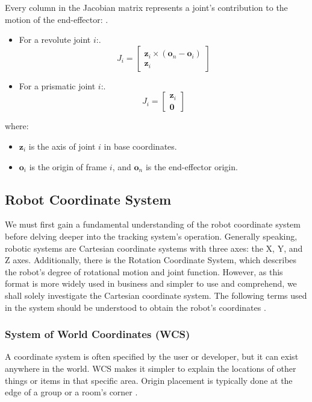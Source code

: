 \documentclass[12pt]{article}
\begin{document}
Every column in the Jacobian matrix represents a joint's contribution to the motion of the end-effector: \cite{ref19}.
\begin{itemize}
    \item For a revolute joint $i$:\cite{ref19}.
    \[
        J_i = \begin{bmatrix}
            \mathbf{z}_i \times (\mathbf{o}_n - \mathbf{o}_i)\\
            \mathbf{z}_i 
        \end{bmatrix}
    \]
    \item For a prismatic joint $i$:\cite{ref19}.
    \[
        J_i = \begin{bmatrix} 
            \mathbf{z}_i \\
            \mathbf{0}
        \end{bmatrix}
    \]
\end{itemize}
where:
\begin{itemize}
    \item $\mathbf{z}_i$ is the axis of joint $i$ in base coordinates.
    \item $\mathbf{o}_i$ is the origin of frame $i$, and $\mathbf{o}_n$ is the end-effector origin.
\end{itemize}

\subsection{Robot Coordinate System} 
We must first gain a fundamental understanding of the robot coordinate system before delving deeper into the tracking system's operation. Generally speaking, robotic systems are Cartesian coordinate systems with three axes: the X, Y, and Z axes. Additionally, there is the Rotation Coordinate System, which describes the robot's degree of rotational motion and joint function. However, as this format is more widely used in business and simpler to use and comprehend, we shall solely investigate the Cartesian coordinate system. The following terms used in the system should be understood to obtain the robot's coordinates \cite{ref24}.

\subsubsection{System of World Coordinates (WCS)}
A coordinate system is often specified by the user or developer, but it can exist anywhere in the world. WCS makes it simpler to explain the locations of other things or items in that specific area. Origin placement is typically done at the edge of a group or a room's corner \cite{ref24}.\\
\end{document}
